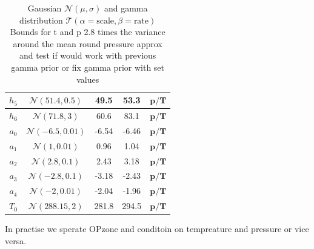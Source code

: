 \begin{table}
\begin{tabular}{ |c||c|c|c|c|   }
		$h_{5}$ &  $\mathcal{N}(51.4,0.5)$&49.5 &53.3&$\bm{p/T}$\\ \hline
		$h_{6}$ &  $\mathcal{N}(71.8,3)$&60.6 &83.1&$\bm{p/T}$\\ \hline
		$a_{0}$ &  $\mathcal{N}(-6.5,0.01)$&-6.54 &-6.46&$\bm{p/T}$\\ \hline
		$a_{1}$ &  $\mathcal{N}(1,0.01)$&0.96 &1.04&$\bm{p/T}$\\ \hline
		$a_{2}$ &  $\mathcal{N}(2.8,0.1)$&2.43 &3.18&$\bm{p/T}$\\ \hline
		$a_{3}$ &  $\mathcal{N}(-2.8,0.1)$&-3.18 &-2.43&$\bm{p/T}$\\ \hline
		$a_{4}$ & $\mathcal{N}(-2,0.01)$ &-2.04 &-1.96&$\bm{p/T}$\\ \hline
		$T_{0}$ &  $\mathcal{N}(288.15,2)$& 281.8 &294.5&$\bm{p/T}$\\
		\hline
	\end{tabular}
	\caption{Gaussian $\mathcal{N}(\mu,\sigma)$ and gamma distribution $\mathcal{T}(\alpha = \text{scale}, \beta = \text{rate})$
		Bounds for t and p 2.8 times the variance around the mean
		round pressure approx and  test if would work with previous gamma prior or fix gamma prior with set values}
	\label{tab:priors}
\end{table}

In practise we sperate OPzone and conditoin on tempreature and pressure  or vice versa. 
